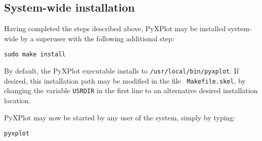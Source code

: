 \subsection{System-wide installation}

Having completed the steps described above, PyXPlot may be installed
system-wide by a superuser with the following additional
step:

\begin{verbatim}
sudo make install
\end{verbatim}

By default, the PyXPlot executable installs to {\tt /usr/local/bin/pyxplot}.
If desired, this installation path may be modified in the file {\tt
Makefile.skel}, by changing the variable {\tt USRDIR} in the first line to an
alternative desired installation location.

PyXPlot may now be started by any user of the system, simply by typing:

\begin{verbatim}
pyxplot
\end{verbatim}

